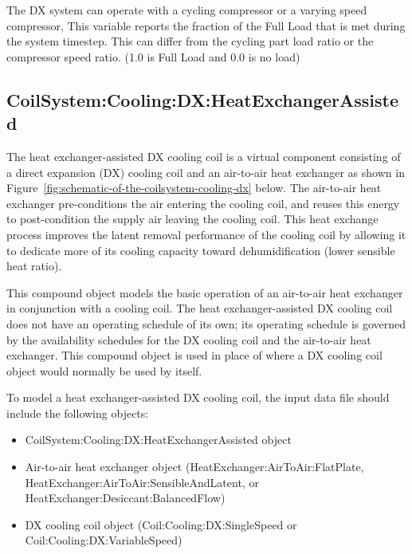 The DX system can operate with a cycling compressor or a varying speed compressor, This variable reports the fraction of the Full Load that is met during the system timestep. This can differ from the cycling part load ratio or the compressor speed ratio. (1.0 is Full Load and 0.0 is no load)

\subsection{CoilSystem:Cooling:DX:HeatExchangerAssisted}\label{coilsystemcoolingdxheatexchangerassisted}

The heat exchanger-assisted DX cooling coil is a virtual component consisting of a direct expansion (DX) cooling coil and an air-to-air heat exchanger as shown in Figure~\ref{fig:schematic-of-the-coilsystem-cooling-dx} below. The air-to-air heat exchanger pre-conditions the air entering the cooling coil, and reuses this energy to post-condition the supply air leaving the cooling coil. This heat exchange process improves the latent removal performance of the cooling coil by allowing it to dedicate more of its cooling capacity toward dehumidification (lower sensible heat ratio).

This compound object models the basic operation of an air-to-air heat exchanger in conjunction with a cooling coil. The heat exchanger-assisted DX cooling coil does not have an operating schedule of its own; its operating schedule is governed by the availability schedules for the DX cooling coil and the air-to-air heat exchanger. This compound object is used in place of where a DX cooling coil object would normally be used by itself.

To model a heat exchanger-assisted DX cooling coil, the input data file should include the following objects:

\begin{itemize}
\item
  CoilSystem:Cooling:DX:HeatExchangerAssisted object
\item
  Air-to-air heat exchanger object (HeatExchanger:AirToAir:FlatPlate, HeatExchanger:AirToAir:SensibleAndLatent, or HeatExchanger:Desiccant:BalancedFlow)
\item
  DX cooling coil object (Coil:Cooling:DX:SingleSpeed or Coil:Cooling:DX:VariableSpeed)
\end{itemize}


